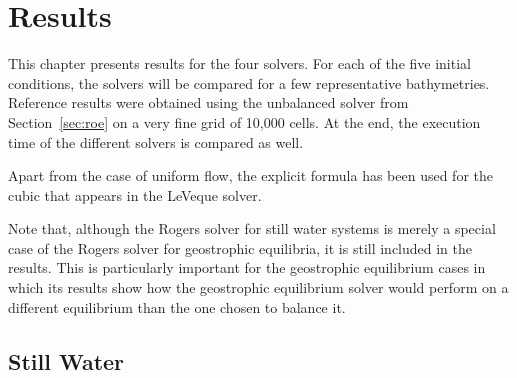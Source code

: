 \chapter{Results}
\label{ch:results}

This chapter presents results for the four solvers. For each of the five initial conditions, the solvers will be compared for a few representative bathymetries. Reference results were obtained using the unbalanced solver from Section~\ref{sec:roe} on a very fine grid of 10,000 cells. At the end, the execution time of the different solvers is compared as well.

Apart from the case of uniform flow, the explicit formula has been used for the cubic that appears in the LeVeque solver.

Note that, although the Rogers solver for still water systems is merely a special case of the Rogers solver for geostrophic equilibria, it is still included in the results. This is particularly important for the geostrophic equilibrium cases in which its results show how the geostrophic equilibrium solver would perform on a different equilibrium than the one chosen to balance it.

\section{Still Water}

